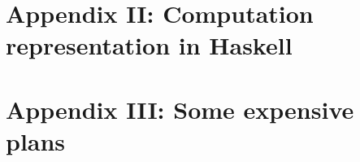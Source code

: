 \documentclass[fontsize=12pt,paper=letter,twosided,cleardoublepage=plain,final]{scrbook}
\begin{document}
\chapter{Appendix II: Computation representation in Haskell}
\label{chapter:appendix2}


\chapter{Appendix III: Some expensive plans}
\label{chapter:appendix3}



\begin{spacing}{1}
\printbibliography
\end{spacing}

\backmatter
\end{document}
